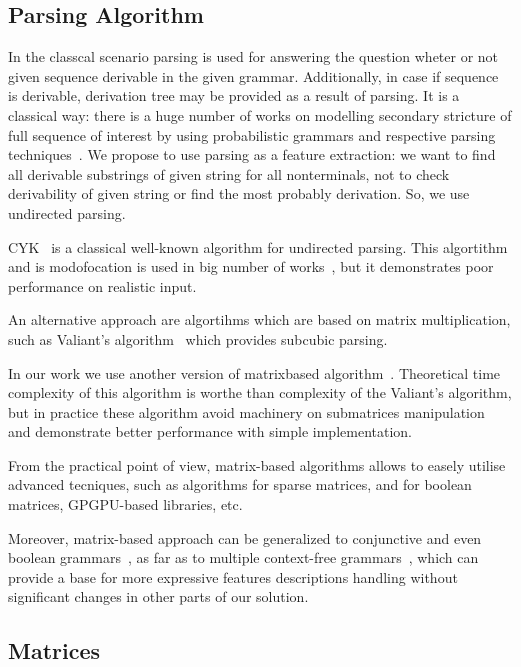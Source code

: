 \documentclass[a4paper,twoside]{article}
\begin{document}
\subsection{Parsing Algorithm}

\noindent In the classcal scenario parsing is used for answering the question wheter or not given sequence derivable in the given grammar.
Additionally, in case if sequence is derivable, derivation tree may be provided as a result of parsing. 
It is a classical way: there is a huge number of works on modelling secondary stricture of full sequence of interest by using probabilistic grammars and respective parsing techniques~\cite{!!!}.
We propose to use parsing as a feature extraction: we want to find all derivable substrings of given string for all nonterminals, not to check derivability of given string or find the most probably derivation.
So, we use undirected parsing.

CYK~\cite{Younger1967RecognitionAP} is a classical well-known algorithm for undirected parsing. 
This algortithm and is modofocation is used in big number of works~\cite{!!!}, but it demonstrates poor performance on realistic input.

An alternative approach are algortihms which are based on matrix multiplication, such as Valiant's algorithm~\cite{Valiant:1975:GCR:1739932.1740048} which provides subcubic parsing.

In our work we use another version of matrixbased algorithm~\cite{Azimov:2018:CPQ:3210259.3210264}.
Theoretical time complexity of this algorithm is worthe than complexity of the Valiant's algorithm, but in practice these algorithm avoid machinery on submatrices manipulation and demonstrate better performance with simple implementation.

From the practical point of view, matrix-based algorithms allows to easely utilise advanced tecniques, such as algorithms for sparse matrices, and for boolean matrices, GPGPU-based libraries, etc.

Moreover, matrix-based approach can be generalized to conjunctive and even boolean grammars~\cite{OKHOTIN2014101}, as far as to multiple context-free grammars~\cite{mcfgMatrices}, which can provide a base for more expressive features descriptions handling without significant changes in other parts of our solution.

\subsection{Matrices}
\end{document}
